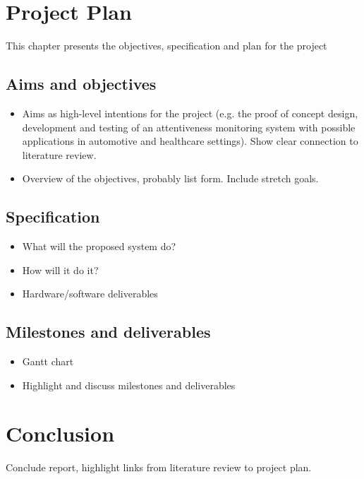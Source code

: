 \documentclass[11pt, parskip=half*,twoside=false]{scrbook}
\begin{document}
\chapter{Project Plan}
This chapter presents the objectives, specification and plan for the project

\section{Aims and objectives}
\begin{itemize}
	\item Aims as high-level intentions for the project (e.g. the proof of concept design, development and testing of an attentiveness monitoring system with possible applications in automotive and healthcare settings). Show clear connection to literature review. 
	\item Overview of the objectives, probably list form. Include stretch goals.
\end{itemize}

\section{Specification}
\begin{itemize}
	\item What will the proposed system do?
	\item How will it do it?
	\item Hardware/software deliverables
\end{itemize}

\section{Milestones and deliverables}
\begin{itemize}
	\item Gantt chart
	\item Highlight and discuss milestones and deliverables
\end{itemize}

\chapter{Conclusion}
Conclude report, highlight links from literature review to project plan.


\end{document}
